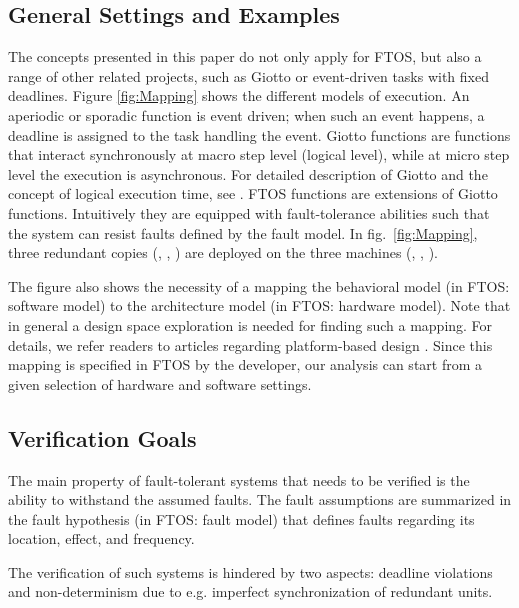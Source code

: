 \documentclass[10pt, a4paper, onecolumn, conference, compsocconf]{IEEEtran}
\begin{document}
\subsection{General Settings and Examples}
The concepts presented in this paper do not only apply for FTOS, but also a range of other related projects, such as Giotto \cite{Henzinger01giotto:a} or event-driven tasks with fixed deadlines. Figure \ref{fig:Mapping} shows the different models of execution. An aperiodic or sporadic function is event driven; when such an event happens, a deadline is assigned to the task handling the event. Giotto functions are functions that interact synchronously at macro step level (logical level), while at micro step level the execution is asynchronous. For detailed description of Giotto and the concept of logical execution time, see \cite{Henzinger01giotto:a}. FTOS functions are extensions of Giotto functions. Intuitively they are equipped with fault-tolerance abilities such that the system can resist faults defined by the fault model. In fig.~\ref{fig:Mapping}, three redundant copies (, , ) are deployed on the three machines (, , ).

The figure also shows the necessity of a mapping the behavioral model (in FTOS: software model) to the architecture model (in FTOS: hardware model). Note that in general a design space exploration is needed for finding such a mapping. For details, we refer readers to articles regarding platform-based design \cite{sangiovannivincentelli:2001:pbd}. Since this mapping is specified in FTOS by the developer, our analysis can start from a given selection of hardware and software settings.

\subsection{Verification Goals\label{subsec.Verification.Goals}}
The main property of fault-tolerant systems that needs to be verified is the ability to withstand the assumed faults. The fault assumptions are summarized in the fault hypothesis (in FTOS: fault model) that defines faults regarding its location, effect, and frequency.

The verification of such systems is hindered by two aspects: deadline violations and non-determinism due to e.g. imperfect synchronization of redundant units.
\end{document}
